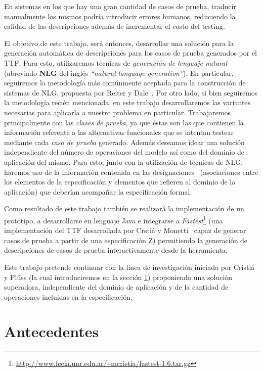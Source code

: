 En sistemas en los que hay una gran cantidad de casos de prueba, traducir manualmente los mismos podría introducir errores humanos, reduciendo la calidad de las descripciones además de incrementar el costo del testing.

El objetivo de este trabajo, será entonces, desarrollar una solución para la generación automática de descripciones para los casos de prueba generados por el TTF. Para esto, utilizaremos técnicas de \emph{generación de lenguaje natural} (abreviado \textbf{NLG} del inglés  \emph{``natural language generation''}). En particular, seguiremos la metodología más comúnmente aceptada para la construcción de sistemas de NLG, propuesta por Reiter y Dale~\cite{reiter_dale}. Por otro lado, si bien seguiremos la metodología recién mencionada, en este trabajo desarrollaremos las variantes necesarias para aplicarla a nuestro problema en particular. Trabajaremos principalmente con las \emph{clases de prueba}, ya que éstas son las que contienen la información referente a las alternativas funcionales que se intentan testear mediante cada \emph{caso de prueba} generado. Además deseamos idear una solución independiente del número de operaciones del modelo así como del dominio de aplicación del mismo. Para esto, junto con la utilización de técnicas de NLG, haremos uso de la información contenida en las designaciones~\cite{jackson} (asociaciones entre los elementos de la especificación y elementos que refieren al dominio de la aplicación) que deberían acompañar la especificación formal. 

Como resultado de este trabajo también se realizará la implementación de un prototipo, a desarrollarse en lenguaje Java e integrarse a \emph{Fastest}\footnote{\url{http://www.fceia.unr.edu.ar/~mcristia/fastest-1.6.tar.gz}} (una implementación del TTF desarrollada por Crstiá y Monetti~\cite{fastest1} capaz de generar casos de prueba a partir de una especificación Z) permitiendo la generación de descripciones de casos de prueba interactivamente desde la herramienta. 

Este trabajo pretende continuar con la línea de investigación iniciada por Cristiá y Plüss \cite{cristia_pluss} (la cual introduciremos en la sección \ref{sec:antecedentes}) proponiendo una solución superadora, independiente del dominio de aplicación y de la cantidad de operaciones incluidas en la especificación.

\section{Antecedentes}
\label{sec:antecedentes}

